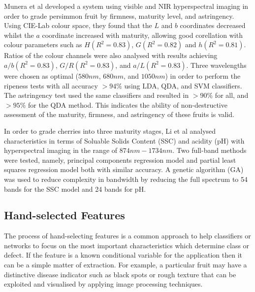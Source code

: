 \documentclass[fleqn,twoside]{article}
\begin{document}
Munera et al \cite{munera} developed a system using visible and NIR hyperspectral imaging in order to grade persimmon fruit by firmness, maturity level, and astringency. Using CIE-Lab colour space, they found that the $L$ and $b$ coordinates decreased whilst the $a$ coordinate increased with maturity, allowing good corellation with colour parameters such as $H(R^2 = 0.83)$, $G(R^2 = 0.82)$ and $h(R^2 = 0.81)$. Ratios of the colour channels were also analysed with results achieving $a/b(R^2 = 0.83)$, $G/R(R^2 = 0.83)$, and $a/L(R^2 = 0.83)$. Three wavelengths were chosen as optimal ($580nm$, $680nm$, and $1050nm$) in order to perform the ripeness tests with all accuracy $>94\%$ using LDA, QDA, and SVM classifiers. The astringency test used the same classifiers and resulted in $>90\%$ for all, and $>95\%$ for the QDA method. This indicates the ability of non-destructive assessment of the maturity, firmness, and astringency of these fruits is valid.

In order to grade cherries into three maturity stages, Li et al \cite{li} analysed characteristics in terms of Soluable Solids Content (SSC) and acidity (pH) with hyperspectral imaging in the range of $874nm-1734nm$. Two full-band methods were tested, namely, principal components regression model and partial least squares regression model both with similar accuracy. A genetic algorithm (GA) was used to reduce complexity in bandwidth by reducing the full spectrum to 54 bands for the SSC model and 24 bands for pH. 





\subsection{Hand-selected Features}

The process of hand-selecting features is a common approach to help classifiers or networks to focus on the most important characteristics which determine class or defect. If the feature is a known conditional variable for the application then it can be a simple matter of extraction. For example, a particular fruit may have a distinctive disease indicator such as black spots or rough texture that can be exploited and visualised by applying image processing techniques. 
\end{document}
